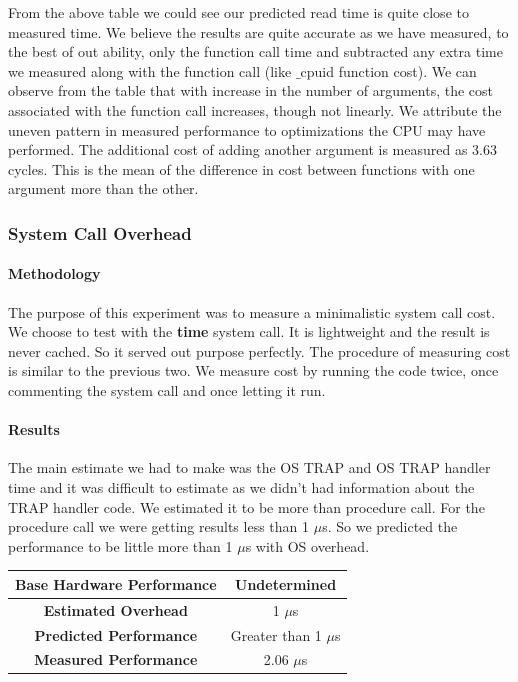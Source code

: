 \documentclass[conference]{IEEEtran}
\begin{document}
From the above table we could see our predicted read time is quite close to measured time. 
We believe the results are quite accurate as we have measured, to the best of out ability, only the function call time and subtracted any extra time we measured along with the function call (like $\_$cpuid function cost).
We can observe from the table that with increase in the number of arguments, the cost associated with the function call increases, though not linearly. We attribute the uneven pattern in measured performance to optimizations the CPU may have performed.  
The additional cost of adding another argument is measured as 3.63 cycles. This is the mean of the difference in cost between functions with one argument more than the other.


\subsubsection{System Call Overhead}

\paragraph{Methodology}

The purpose of this experiment was to measure a minimalistic system call cost. We choose to test with the \textbf{time} system call. It is lightweight and the result is never cached. So it served out purpose perfectly.
The procedure of measuring cost is similar to the previous two. We measure cost by running the code twice, once commenting the system call and once letting it run.

\paragraph{Results}

The main estimate we had to make was the OS TRAP and OS TRAP handler time and it was difficult to estimate as we didn't had information about the TRAP handler code. We estimated it to be more than procedure call. For the procedure call we were getting results less than 1 $\mu$s. So we predicted the performance to be little more than 1 $\mu$s with OS overhead.

\begin{center}
\begin{tabular}{ |c|c| } 
  \hline
  \textbf{Base Hardware Performance} & Undetermined \\ 
  \hline
  \textbf{Estimated Overhead} &  1 $\mu$s \\ 
  \hline
  \textbf{Predicted Performance} & Greater than 1 $\mu$s \\ 
  \hline
  \textbf{Measured Performance} & 2.06 $\mu$s \\ 
  \hline
\end{tabular}
\end{center}
\end{document}

